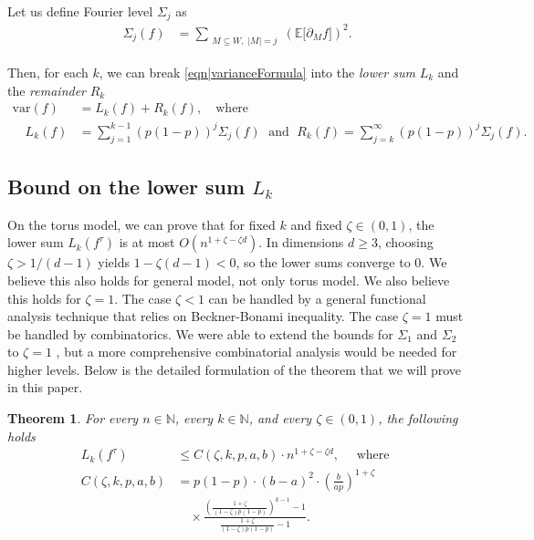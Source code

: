 \documentclass[reqno]{amsart}
\newtheorem{theorem}{Theorem}
\begin{document}
Let us define Fourier level $\Sigma_j$ as 
\begin{align*}
\Sigma_j(f)
&=
\sum_{\substack{M\subseteq W,\;|M|=j}}
\left(\mathbb{E}\big[\partial_M f\big]\right)^2.
\end{align*} 


Then, for each $k$, we can break \eqref{eqn|varianceFormula} into the {\em lower sum} $L_k$ and the {\em remainder} $R_k$
\begin{align*}
\text{var}(f)&=L_k(f)+R_k(f),\quad\text{where} \\
\quad L_k(f)&=\sum_{j=1}^{k-1}(p(1-p))^j\Sigma_j(f)\; \text{ and }\; R_k(f)=\sum_{j=k}^{\infty}(p(1-p))^{j}\Sigma_{j}(f). 
\end{align*} 
 
\subsection{Bound on the lower sum $L_k$}\label{subsec|BLower}
On the torus model, we can prove that for fixed $k$ and fixed $\zeta\in(0,1)$, the lower sum $L_k(f^{\tau})$ is at most $O( n^{1+\zeta-\zeta d})$. 
In dimensions $d \geq 3$, choosing $\zeta > 1/(d-1)$ yields $1 - \zeta(d-1) < 0$, 
so the lower sums converge to $0$. We believe this also holds for general model, not only torus model. We also believe this holds for $\zeta=1$. The case $\zeta<1$ can be handled by a general functional analysis technique that relies on Beckner-Bonami inequality. The case $\zeta=1$ must be handled by combinatorics. We were able to extend the bounds for $\Sigma_1$ and $\Sigma_2$ to $\zeta=1$ \cite{SecondPaper2026}, but a more comprehensive combinatorial analysis would be needed for higher levels. Below is the detailed formulation of the theorem that we will prove in this paper.
 
 
\begin{theorem}\label{thm|SumLowerFourierLevels}
For every $n\in \mathbb N$, every $k\in\mathbb N$, and every $\zeta\in(0,1)$, the following holds
\begin{align}
L_k(f^{\tau})&\leq C(\zeta,k,p,a,b)\cdot n^{1+\zeta-\zeta d},\quad\text{ where }\label{eqn|SumLowerFourierLevels}\\
C(\zeta,k,p,a,b) &=p(1-p)\cdot (b-a)^2\cdot \left(\frac{b}{ap}\right)^{1+\zeta} \nonumber\\
&\quad\times\frac{\left(\frac{1+\zeta}{(1-\zeta)p(1-p)}\right)^{k-1}-1}{\frac{1+\zeta}{(1-\zeta)p(1-p)}-1}.\label{eqn|CoefficientInFrontOfSumOfLevels}
\end{align}
\end{theorem}
\end{document}
